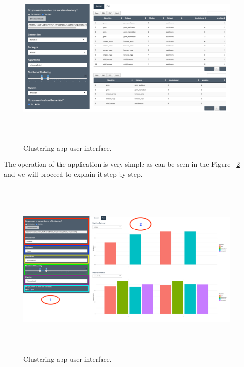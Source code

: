 \begin{figure}[htbp]
  \centering
   \includegraphics[width=14cm, height=9cm]{img/app}
    \caption{Clustering app user interface.}
    \label{fig:layoutApp}%
\end{figure}

The operation of the application is very simple as can be seen in the Figure ~\ref{fig:layoutApp1} and we will proceed to explain it step by step.

\begin{figure}[htbp]
  \centering
   \includegraphics[width=14cm, height=9cm]{img/app1}
    \caption{Clustering app user interface.}
    \label{fig:layoutApp1}%
\end{figure}

